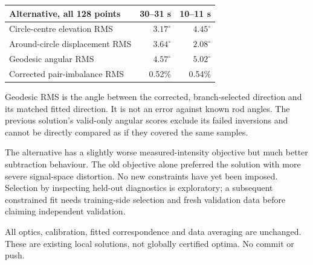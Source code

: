 \documentclass[11pt,a4paper]{article}
\begin{document}
\begin{tabular}{lrr}\toprule
Alternative, all 128 points & 30--31 s & 10--11 s\\\midrule
Circle-centre elevation RMS & $3.17^\circ$ & $4.45^\circ$\\
Around-circle displacement RMS & $3.64^\circ$ & $2.08^\circ$\\
Geodesic angular RMS & $4.57^\circ$ & $5.02^\circ$\\
Corrected pair-imbalance RMS & 0.52\% & 0.54\%\\\bottomrule\end{tabular}

Geodesic RMS is the angle between the corrected, branch-selected direction and its matched fitted direction. It is not an error against known rod angles. The previous solution's valid-only angular scores exclude its failed inversions and cannot be directly compared as if they covered the same samples.

The alternative has a slightly worse measured-intensity objective but much better subtraction behaviour. The old objective alone preferred the solution with more severe signal-space distortion. No new constraints have yet been imposed. Selection by inspecting held-out diagnostics is exploratory; a subsequent constrained fit needs training-side selection and fresh validation data before claiming independent validation.

All optics, calibration, fitted correspondence and data averaging are unchanged. These are existing local solutions, not globally certified optima. No commit or push.
\end{document}

